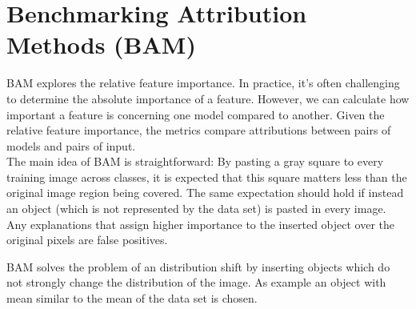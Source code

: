 \section{Benchmarking Attribution Methods (BAM) \cite{yang2019benchmarking}}

BAM explores the relative feature importance. In practice, it's often challenging to determine the absolute importance of a feature.  However, we can calculate how important a feature is concerning one model compared to another. Given the relative feature importance, the metrics compare attributions between pairs of models and pairs of input.\\

The main idea of BAM is straightforward: By pasting a gray square to every training image across classes, it is expected that this square matters less than the original image region being covered. The same expectation should hold if instead an object (which is not represented by the data set) is pasted in every image. Any explanations that assign higher importance to the inserted object over the original pixels are false positives.

BAM solves the problem of an distribution shift by inserting objects which do not strongly change the distribution of the image. As example an object with mean similar to the mean of the data set is chosen.

